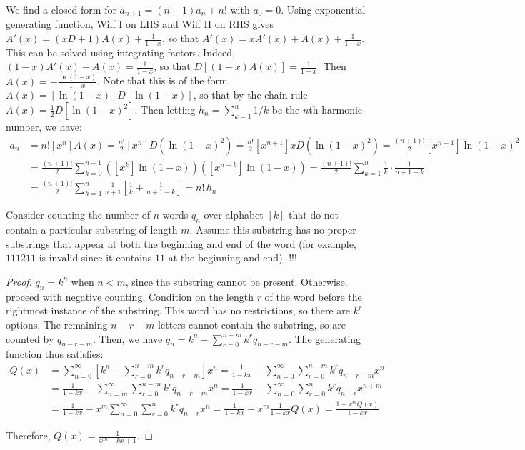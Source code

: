 \documentclass[a4paper]{article}
\begin{document}
\begin{example}
We find a closed form for $a_{n+1}=(n+1)a_n+n!$ with $a_0=0$. Using exponential generating function, Wilf I on LHS and Wilf II on RHS gives $A'(x)=(xD+1)A(x)+\frac1{1-x}$, so that $A'(x)=xA'(x)+A(x)+\frac1{1-x}$. This can be solved using integrating factors. Indeed, $(1-x)A'(x)-A(x)=\frac1{1-x}$, so that $D[(1-x)A(x)]=\frac1{1-x}$. Then $A(x)=-\frac{\ln(1-x)}{1-x}$. Note that this is of the form $A(x)=[\ln(1-x)]D[\ln(1-x)]$, so that by the chain rule $A(x)=\frac12D[\ln(1-x)^2]$. Then letting $h_n=\sum_{k=1}^n1/k$ be the $n$th harmonic number, we have:
\begin{align*}
a_n
&=n![x^n]A(x)
=\frac{n!}2[x^n]D(\ln(1-x)^2)
=\frac{n!}2[x^{n+1}]xD(\ln(1-x)^2)
=\frac{(n+1)!}2[x^{n+1}]\ln(1-x)^2\\
&=\frac{(n+1)!}2\sum_{k=0}^{n+1}([x^k]\ln(1-x))([x^{n-k}]\ln(1-x))
=\frac{(n+1)!}2\sum_{k=1}^{n}\frac1k\cdot\frac1{n+1-k}\\
&=\frac{(n+1)!}2\sum_{k=1}^n\frac1{n+1}\left[\frac1k+\frac1{n+1-k}\right]
=n!\,h_n
\end{align*}
\end{example}

\begin{example}
Consider counting the number of $n$-words $q_n$ over alphabet $[k]$ that do not contain a particular substring of length $m$. Assume this substring has no proper substrings that appear at both the beginning and end of the word (for example, $111211$ is invalid since it contains $11$ at the beginning and end). !!!

\begin{hl}
\begin{proof}
$q_n=k^n$ when $n<m$, since the substring cannot be present. Otherwise, proceed with negative counting. Condition on the length $r$ of the word before the rightmost instance of the substring. This word has no restrictions, so there are $k^r$ options. The remaining $n-r-m$ letters cannot contain the substring, so are counted by $q_{n-r-m}$. Then, we have $q_n=k^n-\sum_{r=0}^{n-m}k^rq_{n-r-m}$. The generating function thus satisfies:
\begin{align*}
Q(x)
&=\sum_{n=0}^\infty\left[k^n-\sum_{r=0}^{n-m}k^rq_{n-r-m}\right]x^n
=\frac1{1-kx}-\sum_{n=0}^\infty\sum_{r=0}^{n-m}k^rq_{n-r-m}x^n\\
&=\frac1{1-kx}-\sum_{n=m}^\infty\sum_{r=0}^{n-m}k^rq_{n-r-m}x^n
=\frac1{1-kx}-\sum_{n=0}^\infty\sum_{r=0}^{n}k^rq_{n-r}x^{n+m}\\
&=\frac1{1-kx}-x^m\sum_{n=0}^\infty\sum_{r=0}^{n}k^rq_{n-r}x^{n}
=\frac1{1-kx}-x^m\frac1{1-kx}Q(x)
=\frac{1-x^mQ(x)}{1-kx}
\end{align*}

Therefore, $Q(x)=\frac1{x^m-kx+1}$.
\end{proof}
\end{hl}
\end{example}
\end{document}
